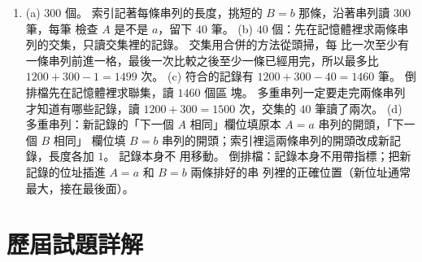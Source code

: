 \begin{enumerate}
\begin{itemize}
最後：標頭 $0110$（$0$）左 $\to 1011$；$1011$（$1$）左 $\to 0001$，右 $\to 1110$；$0001$（$2$）
左 $\to$ 自己，右 $\to 0100$；$0100$（$3$）左 $\to$ 自己，右 $\to 0110\uparrow$；$1110$（$2$）
左 $\to 1010$，右 $\to$ 自己；$1010$（$4$）左 $\to$ 自己，右 $\to 1011\uparrow$。 把往回的指標
換成元素節點，正好是 (b) 的壓縮二元 trie。
\item (d) 刪除 $0110$：它在標頭；搜尋經 $1011$、$0001$（第 $2$ 位 $1$）、$0100$（第 $3$ 位
$1$），從 $0100$ 的右指標回到標頭，$q = 0100 \ne p$，是第二種情況。 $0100$ 搬進標頭；搜尋
$0100$ 最後走的是 $0100$ 自己的左指標，改成指向標頭；$q$ 的另一個指標也就指向標頭，
$q$ 的父節點 $0001$ 的右指標改成指回標頭，釋放 $q$。 結果：標頭 $0100$（$0$）左 $\to
1011$；$0001$（$2$）左 $\to$ 自己，右 $\to 0100\uparrow$；其他不變。
刪除 $1110$：搜尋經 $1011$ 到 $1110$，第 $2$ 位 $1$，走 $1110$ 自己的右指標，$q = p$，是
第一種情況。 $1110$ 的另一個指標指向 $1010$，所以 $1011$ 的右指標改成指向 $1010$，釋放
$1110$。 結果：標頭 $0100$ 左 $\to 1011$；$1011$（$1$）左 $\to 0001$，右 $\to 1010$；
$0001$（$2$）左 $\to$ 自己，右 $\to 0100\uparrow$；$1010$（$4$）左 $\to$ 自己，右 $\to
1011\uparrow$。
\end{itemize}

\item (a) $300$ 個。 索引記著每條串列的長度，挑短的 $B = b$ 那條，沿著串列讀 $300$ 筆，每筆
檢查 $A$ 是不是 $a$，留下 $40$ 筆。
(b) $40$ 個：先在記憶體裡求兩條串列的交集，只讀交集裡的記錄。 交集用合併的方法從頭掃，每
比一次至少有一條串列前進一格，最後一次比較之後至少一條已經用完，所以最多比
$1200 + 300 - 1 = 1499$ 次。
(c) 符合的記錄有 $1200 + 300 - 40 = 1460$ 筆。 倒排檔先在記憶體裡求聯集，讀 $1460$ 個區
塊。 多重串列一定要走完兩條串列才知道有哪些記錄，讀 $1200 + 300 = 1500$ 次，交集的 $40$
筆讀了兩次。
(d) 多重串列：新記錄的「下一個 $A$ 相同」欄位填原本 $A = a$ 串列的開頭，「下一個 $B$ 相同」
欄位填 $B = b$ 串列的開頭；索引裡這兩條串列的開頭改成新記錄，長度各加 $1$。 記錄本身不
用移動。 倒排檔：記錄本身不用帶指標；把新記錄的位址插進 $A = a$ 和 $B = b$ 兩條排好的串
列裡的正確位置（新位址通常最大，接在最後面）。
\end{enumerate}

\section*{歷屆試題詳解}

